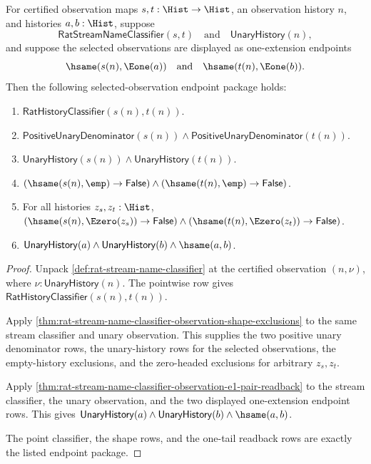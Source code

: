 \begin{theorem}
\label{thm:rat-stream-name-observation-full-endpoint-package}
For certified observation maps $s,t:\Hist\to\Hist$, an observation history $n$,
and histories $a,b:\Hist$, suppose
$$
\mathsf{RatStreamNameClassifier}(s,t)\quad\text{and}\quad
\mathsf{UnaryHistory}(n),
$$
and suppose the selected observations are displayed as one-extension endpoints
$$
\hsame(s(n),\Eone(a))\quad\text{and}\quad
\hsame(t(n),\Eone(b)).
$$
Then the following selected-observation endpoint package holds:
\begin{enumerate}
  \item $\mathsf{RatHistoryClassifier}(s(n),t(n))$.
  \item $\mathsf{PositiveUnaryDenominator}(s(n))\land
  \mathsf{PositiveUnaryDenominator}(t(n))$.
  \item $\mathsf{UnaryHistory}(s(n))\land\mathsf{UnaryHistory}(t(n))$.
  \item $(\hsame(s(n),\emp)\to\mathsf{False})\land
  (\hsame(t(n),\emp)\to\mathsf{False})$.
  \item For all histories $z_s,z_t:\Hist$,
  $(\hsame(s(n),\Ezero(z_s))\to\mathsf{False})\land
  (\hsame(t(n),\Ezero(z_t))\to\mathsf{False})$.
  \item $\mathsf{UnaryHistory}(a)\land\mathsf{UnaryHistory}(b)\land
  \hsame(a,b)$.
\end{enumerate}
\end{theorem}
\begin{proof}
Unpack \autoref{def:rat-stream-name-classifier} at the certified observation
$(n,\nu)$, where $\nu:\mathsf{UnaryHistory}(n)$. The pointwise row gives
$\mathsf{RatHistoryClassifier}(s(n),t(n))$.

Apply \autoref{thm:rat-stream-name-classifier-observation-shape-exclusions} to
the same stream classifier and unary observation. This supplies the two positive
unary denominator rows, the unary-history rows for the selected observations,
the empty-history exclusions, and the zero-headed exclusions for arbitrary
$z_s,z_t$.

Apply \autoref{thm:rat-stream-name-classifier-observation-e1-pair-readback} to
the stream classifier, the unary observation, and the two displayed
one-extension endpoint rows. This gives
$\mathsf{UnaryHistory}(a)\land\mathsf{UnaryHistory}(b)\land\hsame(a,b)$.

The point classifier, the shape rows, and the one-tail readback rows are exactly
the listed endpoint package.
\end{proof}

